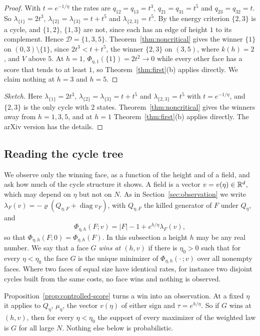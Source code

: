 \ifarxivbuild
\begin{proof}
With $t=e^{-1/\eta}$ the rates are $q_{12}=q_{13}=t^3$, $q_{21}=q_{31}=t^5$ and
$q_{23}=q_{32}=t$. So $\lambda_{\{1\}}=2t^3$, $\lambda_{\{2\}}=\lambda_{\{3\}}=t+t^5$
and $\lambda_{\{2,3\}}=t^5$. By the energy criterion $\{2,3\}$ is a cycle, and
$\{1,2\}$, $\{1,3\}$ are not, since each has an edge of height $1$ to its
complement. Hence $\mathcal D=\{1,3,5\}$. Theorem~\ref{thm:noncritical} gives
the winner $\{1\}$ on $(0,3)\setminus\{1\}$, since $2t^3<t+t^5$, the winner
$\{2,3\}$ on $(3,5)$, where $k(h)=2$, and $V$ above $5$. At $h=1$,
$\Phi_{\eta,1}(\{1\})=2t^2\to0$ while every other face has a score that tends
to at least $1$, so Theorem~\ref{thm:first}(b) applies directly. We claim
nothing at $h=3$ and $h=5$.
\end{proof}
\else
\begin{proof}[Sketch]
Here $\lambda_{\{1\}}=2t^3$, $\lambda_{\{2\}}=\lambda_{\{3\}}=t+t^5$ and
$\lambda_{\{2,3\}}=t^5$ with $t=e^{-1/\eta}$, and $\{2,3\}$ is the only cycle with 2 states.
Theorem~\ref{thm:noncritical} gives the winners away from $h=1,3,5$, and at $h=1$
Theorem~\ref{thm:first}(b) applies directly. The arXiv version has the details.
\end{proof}
\fi

\subsection{Reading the cycle tree}\label{sec:cycle-tree}

We observe only the winning face, as a function of the height and of a
field, and ask how much of the cycle structure it shows. A field is a vector $v=v(\eta)\in\mathbb{R}^d$, which may depend on $\eta$ but not on
$N$. As in Section~\ref{sec:observation} we write
$\lambda_F(v)=-\varrho(Q_{\eta,F}+\operatorname{diag}v_F)$, with $Q_{\eta,F}$ the
killed generator of $F$ under $Q_\eta$, and
\[
 \Phi_{\eta,h}(F;v)=|F|-1+e^{h/\eta}\lambda_F(v),
\]
so that $\Phi_{\eta,h}(F;0)=\Phi_{\eta,h}(F)$. In this subsection a height $h$
may be any real number. We say that a face $G$ \emph{wins at $(h,v)$} if there
is $\eta_0>0$ such that for every $\eta<\eta_0$ the face $G$ is the unique
minimizer of $\Phi_{\eta,h}(\cdot\,;v)$ over all nonempty faces. Where two
faces of equal size have identical rates, for instance two disjoint cycles
built from the same costs, no face wins and nothing is observed.

Proposition~\ref{prop:controlled-score} turns a win into an observation. At a
fixed $\eta$ it applies to $Q_\eta$, $\mu_\eta$, the vector $v(\eta)$ of either
sign and $\tau=e^{h/\eta}$. So if $G$ wins at $(h,v)$, then for every
$\eta<\eta_0$ the support of every maximizer of the weighted law is $G$ for all
large $N$. Nothing else below is probabilistic.

